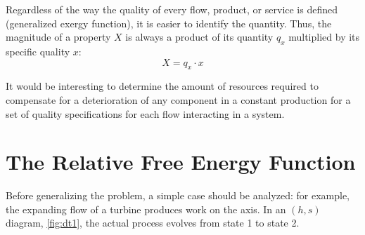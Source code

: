 \documentclass[energies,article,submit,moreauthors,pdftex]{Definitions/mdpi}
\begin{document}
Regardless of the way the quality of every flow, product, or service is defined (generalized exergy function), it is easier to identify the quantity. Thus, the magnitude of a property $X$ is always a product of its quantity $q_x$ multiplied by its specific quality $x$:
\begin{equation}
X=q_x\cdot x
\end{equation}                      

It would be interesting to determine the amount of resources required to compensate for a deterioration of any component in a constant production for a set of quality specifications for each flow interacting in a system.

\section{The Relative Free Energy Function}
Before generalizing the problem, a simple case should be analyzed: for example, the expanding flow of a turbine produces work on the axis. In an $(h, s)$ diagram, \cref{fig:dt1}, the actual process evolves from state 1 to state 2. 
\end{document}
